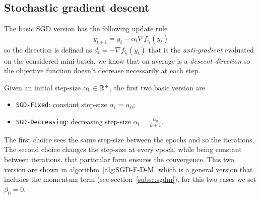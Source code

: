 

\subsection{Stochastic gradient descent}\label{subsc:sgd}

The basic SGD version has the following update rule
\begin{equation}\label{eq:sgd-base}
y_{t+1}=y_t-\alpha_t\nabla f_{i_t}(y_t)
\end{equation}
so the direction is defined as $d_t=-\nabla f_{i_t}(y_t)$ that is the \emph{anti-gradient} evaluated on the considered mini-batch, we know that on average is a \emph{descent direction} so the objective function doesn't decrease necessarily at each step.

Given an initial step-size $\alpha_0\in\mathbb{R}^+$, the first two basic version are 
\begin{itemize}
\item \texttt{SGD-Fixed}: constant step-size $\alpha_t=\alpha_0$;
\item \texttt{SGD-Decreasing}: decreasing step-size $\alpha_t=\frac{\alpha_0}{k+1}$.
\end{itemize}
The first choice sees the same step-size between the epochs and so the iterations. The second choice changes the step-size at every epoch, while being constant between iterations, that particular form ensures the convergence. This two version are shown in algorithm~\vref{alg:SGD-F-D-M} which is a general version that includes the momentum term (see section~\ref{subsc:sgdm}), for this two cases we set $\beta_0=0$.

